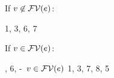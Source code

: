 \begin{bycase}
\Case{\Rthax}
\begin{derivation}
\step{\axO\in\cx}{\premof{\Rthax}}
\step{\cxwfO}{\premof{\Rthax}}
\step{\efvar{\tsbslash{\expr}{\tvarS}{\typS}}=\efvar{\expr}}
     {}
\end{derivation}


\Case{\Rthabs}
\begin{derivation}
\end{derivation}
\noindent
If $v\not\in\mathcal{FV}(e)$:
\begin{derivatioN}{5}
     {}
     {1, 3, 6, 7}
\end{derivatioN}
If $v\in\mathcal{FV}(e)$:
\begin{derivatioN}{5}
     {, 6, \hyp\ $v\in\mathcal{FV}(e)$}
     {1, 3, 7, 8, 5}
\end{derivatioN}


\end{bycase}
